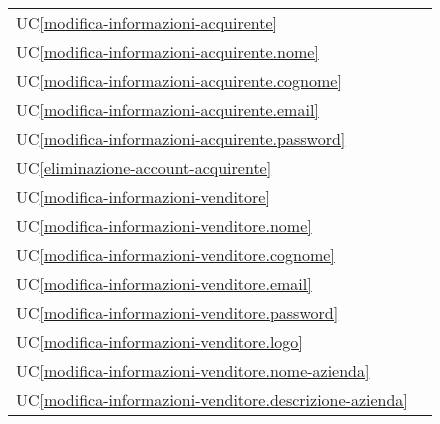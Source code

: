 \begin{longtable}{C{6cm} C{6cm}}
	UC\ref{modifica-informazioni-acquirente} &  \\

    UC\ref{modifica-informazioni-acquirente.nome} &  \\

	UC\ref{modifica-informazioni-acquirente.cognome} &  \\

    UC\ref{modifica-informazioni-acquirente.email} &  \\

	UC\ref{modifica-informazioni-acquirente.password} &  \\

    UC\ref{eliminazione-account-acquirente} &  \\

	UC\ref{modifica-informazioni-venditore} &  \\

    UC\ref{modifica-informazioni-venditore.nome} &  \\

    UC\ref{modifica-informazioni-venditore.cognome} &  \\

	UC\ref{modifica-informazioni-venditore.email} &  \\

    UC\ref{modifica-informazioni-venditore.password} &  \\

	UC\ref{modifica-informazioni-venditore.logo} &  \\

    UC\ref{modifica-informazioni-venditore.nome-azienda} &  \\

	UC\ref{modifica-informazioni-venditore.descrizione-azienda} &  \\


\end{longtable}
